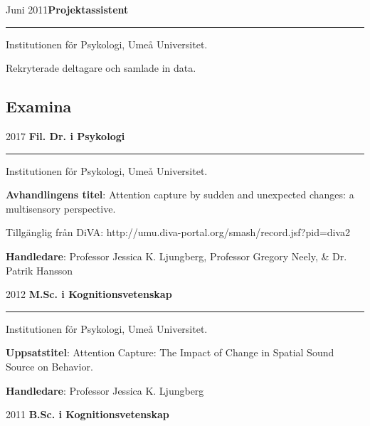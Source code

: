 \documentclass[]{article}
\begin{document}
Juni 2011\hspace{0.75cm}\textbf{Projektassistent}\vspace{1mm}

\hrule
\begin{changemargin}{2.3cm}{2.4cm}

Institutionen för Psykologi, Umeå Universitet.

Rekryterade deltagare och samlade in data.

\end{changemargin}

\hypertarget{examina}{%
\subsection{Examina}\label{examina}}

2017 \hspace{1.5cm} \textbf{Fil. Dr. i Psykologi}\vspace{1mm}

\hrule

\begin{changemargin}{2.3cm}{2.4cm}

Institutionen för Psykologi, Umeå Universitet.

\textbf{Avhandlingens titel}: Attention capture by sudden and unexpected changes: a multisensory perspective. 

Tillgänglig från DiVA: \sloppy http://umu.diva-portal.org/smash/record.jsf?pid=diva2%

\textbf{Handledare}: Professor Jessica K. Ljungberg, Professor Gregory Neely, \& Dr. Patrik Hansson
\end{changemargin}

2012 \hspace{1.5cm}\textbf{M.Sc. i Kognitionsvetenskap}\vspace{1mm}

\hrule
\begin{changemargin}{2.3cm}{2.4cm}

Institutionen för Psykologi, Umeå Universitet.

\textbf{Uppsatstitel}: Attention Capture: The Impact of Change in Spatial Sound Source on Behavior. 
    
\textbf{Handledare}: Professor Jessica K. Ljungberg
\end{changemargin}

2011 \hspace{1.5cm}\textbf{B.Sc. i Kognitionsvetenskap}\vspace{1mm}
\end{document}
